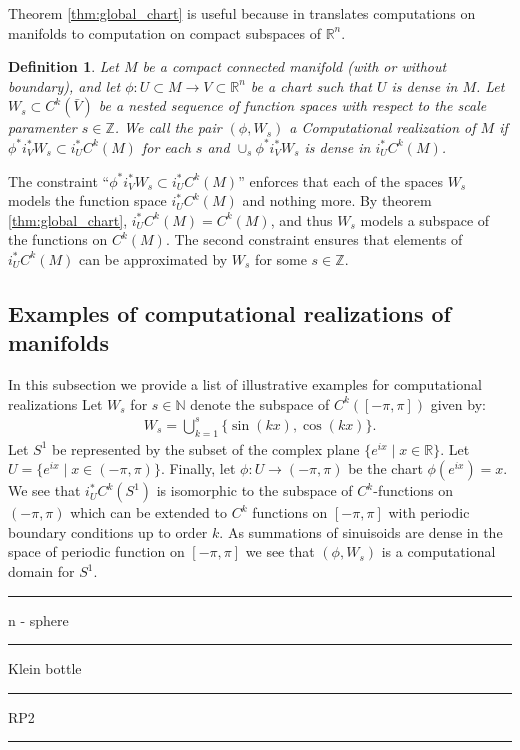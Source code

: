 \documentclass[12pt]{amsart}
\newtheorem{defn}[thm]{Definition}
\newenvironment{example}
  { \newline {\bf Example:} }
  {\rule{1ex}{1ex} }
\begin{document}
  Theorem \ref{thm:global_chart} is useful because in translates computations on manifolds to computation on compact subspaces of $\mathbb{R}^n$.

\begin{defn}
  Let $M$ be a compact connected manifold (with or without boundary), and let $\phi:U \subset M \to V \subset \mathbb{R}^n$ be a chart such that $U$ is dense in $M$.
  Let $W_s \subset C^k(\bar{V})$ be a nested sequence of function spaces
  with respect to the scale paramenter $s \in \mathbb{Z}$.
  We call the pair $(\phi, W_s)$ a \emph{Computational realization of $M$}
  if $\phi^* i_V^*W_s \subset i_{U}^* C^k(M)$ for each $s$ and $\cup_s \phi^*i_V^*W_s$ is dense in $i_{U}^*C^k(M)$.
\end{defn}

The constraint ``$\phi^*i_V^*W_s \subset i_U^* C^k(M)$'' enforces that each of the spaces $W_s$ models the function space $i_U^* C^k(M)$ and nothing more.
By theorem \ref{thm:global_chart}, $i_U^* C^k(M) = C^k(M)$, and thus $W_s$ models a subspace of the functions on $C^k(M)$.
The second constraint ensures that elements of $i_U^* C^k(M)$ can be approximated by $W_s$ for some $s \in \mathbb{Z}$.

\subsection{Examples of computational realizations of manifolds}
In this subsection we provide a list of illustrative examples for computational realizations
\begin{example}
Let $W_s$ for $s \in \mathbb{N}$ denote the subspace of $C^k( [-\pi,\pi])$ given by:
\begin{align*}
  W_s = \bigcup_{k=1}^{s} \{ \sin( k x),\cos( kx) \}.
\end{align*}
Let $S^1$ be represented by the subset of the complex plane $\{ e^{ix} \mid x \in \mathbb{R} \}$.
Let $U = \{ e^{ix} \mid x \in (-\pi,\pi) \}$.
Finally, let $\phi: U \to (-\pi,\pi)$ be the chart $\phi( e^{ix}) = x$.
We see that $i_U^*C^k(S^1)$ is isomorphic to the subspace of $C^k$-functions on $(-\pi,\pi)$
which can be extended to $C^k$ functions on $[-\pi,\pi]$ with periodic boundary conditions up to order $k$.
As summations of sinuisoids are dense in the space of periodic function on $[-\pi,\pi]$ we see that $(\phi,W_s)$ is a computational domain for $S^1$.
\end{example}
\begin{example}
n - sphere
\end{example}
\begin{example}
Klein bottle
\end{example}
\begin{example}
RP2
\end{example}
\end{document}

